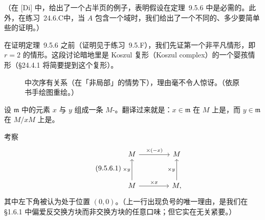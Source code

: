 （在 [Di] 中，\trDieudonne{}给出了一个占半页的例子，表明\trNoetherian{}假设在定理~9.5.6 中是必需的。此外，在\mbox{练习~24.6.C}中，当 $A$ 包含一个域时，我们给出了一个不同的、多少要简单些的证明。）

在证明定理~9.5.6 之前（证明见于\mbox{练习~9.5.F}），我们先证第一个非平凡情形，即 $r=2$ 的情形。这段讨论暗地里是 Koszul 复形（Koszul complex）的一个婴孩情形（\S24.4.1 将简要提到这个复形）。

\begin{figure}[htbp]
\centering
{}
\caption{\trRegularSequence{}中次序有关系（在「非局部」的情势下），理由毫不令人惊讶。（依原书手绘图重绘。）}\label{fig:regular-sequence-order}
\end{figure}

设 $\mathfrak{m}$ 中的元素 $x$ 与 $y$ 组成一条 $M$-\trRegularSequence。翻译过来就是：$x\in\mathfrak{m}$ 在 $M$ 上是\trNonZerodivisor，而 $y\in\mathfrak{m}$ 在 $M/xM$ 上是\trNonZerodivisor。

考察\trDoubleComplex
\begin{equation*}\tag{9.5.6.1}\label{eq:double-complex-regular-sequence}
\begin{tikzcd}[row sep=3em, column sep=4.2em]
M \ar[r, "\times(-x)"] & M \\
M \ar[u, "\times y"] \ar[r, "\times x"] & M, \ar[u, "\times y"]
\end{tikzcd}
\end{equation*}
其中左下角被认为处于位置 $(0,0)$。（上一行出现负号的唯一理由，是我们在 \S1.6.1 中偏爱反交换方块而非交换方块的任意口味；但它实在无关紧要。）

